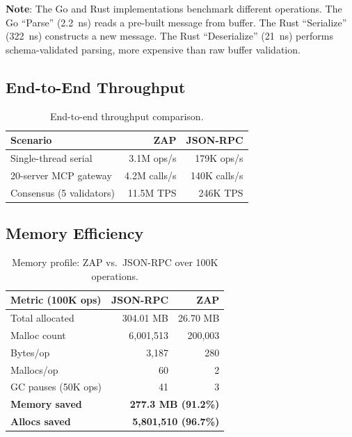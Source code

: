 \documentclass[11pt,letterpaper]{article}
\begin{document}
\textbf{Note}: The Go and Rust implementations benchmark different operations. The Go ``Parse'' (2.2~ns) reads a pre-built message from buffer. The Rust ``Serialize'' (322~ns) constructs a new message. The Rust ``Deserialize'' (21~ns) performs schema-validated parsing, more expensive than raw buffer validation.

\subsection{End-to-End Throughput}

\begin{table}[H]
\centering
\begin{tabular}{@{}lrr@{}}
\toprule
\textbf{Scenario} & \textbf{ZAP} & \textbf{JSON-RPC} \\
\midrule
Single-thread serial & 3.1M ops/s & 179K ops/s \\
20-server MCP gateway & 4.2M calls/s & 140K calls/s \\
Consensus (5 validators) & 11.5M TPS & 246K TPS \\
\bottomrule
\end{tabular}
\caption{End-to-end throughput comparison.}
\label{tab:e2e-throughput}
\end{table}

\subsection{Memory Efficiency}

\begin{table}[H]
\centering
\begin{tabular}{@{}lrr@{}}
\toprule
\textbf{Metric (100K ops)} & \textbf{JSON-RPC} & \textbf{ZAP} \\
\midrule
Total allocated & 304.01 MB & 26.70 MB \\
Malloc count & 6,001,513 & 200,003 \\
Bytes/op & 3,187 & 280 \\
Mallocs/op & 60 & 2 \\
GC pauses (50K ops) & 41 & 3 \\
\midrule
\textbf{Memory saved} & \multicolumn{2}{r}{\textbf{277.3 MB (91.2\%)}} \\
\textbf{Allocs saved} & \multicolumn{2}{r}{\textbf{5,801,510 (96.7\%)}} \\
\bottomrule
\end{tabular}
\caption{Memory profile: ZAP vs.\ JSON-RPC over 100K operations.}
\label{tab:memory}
\end{table}
\end{document}
